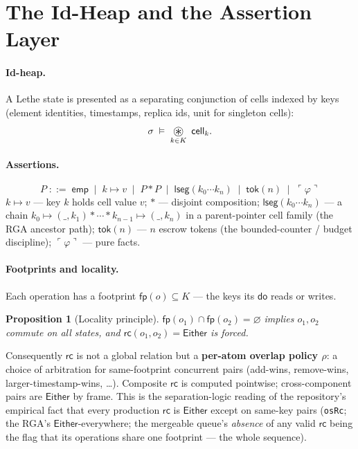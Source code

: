 \documentclass[11pt]{article}
\newtheorem{proposition}[theorem]{Proposition}
\newcommand{\lean}[1]{\texttt{#1}}
\newcommand{\dodo}{\mathsf{do}}
\newcommand{\rc}{\mathsf{rc}}
\newcommand{\fp}{\mathsf{fp}}
\newcommand{\emp}{\mathsf{emp}}
\newcommand{\tok}{\mathsf{tok}}
\newcommand{\lseg}{\mathsf{lseg}}
\newcommand{\Either}{\mathsf{Either}}
\newcommand{\sepmap}{\mathop{\vcenter{\hbox{\Large$\circledast$}}}}
\begin{document}
\section{The Id-Heap and the Assertion Layer}\label{sec:idheap}

\paragraph{Id-heap.} A Lethe state is presented as a separating
conjunction of cells indexed by keys (element identities, timestamps,
replica ids, unit for singleton cells):
\[
\sigma \;\vDash\; \sepmap_{k \in K}\ \mathsf{cell}_k .
\]

\paragraph{Assertions.}
\[
P \;::=\; \emp
  \;\mid\; k \mapsto v
  \;\mid\; P * P
  \;\mid\; \lseg(k_0 \cdots k_n)
  \;\mid\; \tok(n)
  \;\mid\; \ulcorner \varphi \urcorner
\]
$k \mapsto v$ --- key $k$ holds cell value $v$; $*$ --- disjoint
composition; $\lseg(k_0 \cdots k_n)$ --- a chain
$k_0 \mapsto (\_, k_1) * \cdots * k_{n-1} \mapsto (\_, k_n)$ in a
parent-pointer cell family (the RGA ancestor path); $\tok(n)$ --- $n$
escrow tokens (the bounded-counter / budget discipline);
$\ulcorner \varphi \urcorner$ --- pure facts.

\paragraph{Footprints and locality.} Each operation has a footprint
$\fp(o) \subseteq K$ --- the keys its $\dodo$ reads or writes.

\begin{proposition}[Locality principle]\label{prop:locality}
$\fp(o_1) \cap \fp(o_2) = \varnothing$ implies $o_1, o_2$ commute on all
states, and $\rc(o_1,o_2) = \Either$ is forced.
\end{proposition}

Consequently $\rc$ is not a global relation but a \textbf{per-atom overlap
policy $\rho$}: a choice of arbitration for same-footprint concurrent
pairs (add-wins, remove-wins, larger-timestamp-wins, \dots). Composite
$\rc$ is computed pointwise; cross-component pairs are $\Either$ by frame.
This is the separation-logic reading of the repository's empirical fact
that every production $\rc$ is $\Either$ except on same-key pairs
(\lean{osRc}; the RGA's $\Either$-everywhere; the mergeable queue's
\emph{absence} of any valid $\rc$ being the flag that its operations share
one footprint --- the whole sequence).
\end{document}
